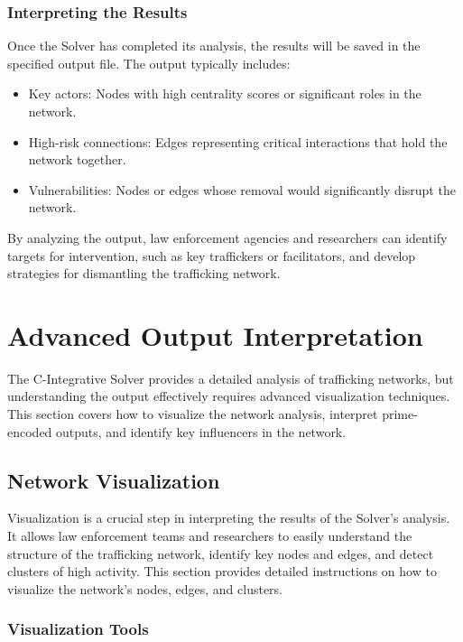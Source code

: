 \documentclass[%
 preprint, linenumbers,
 amsmath,amssymb,
 aps, physrev,
]{revtex4-2}
\begin{document}
\subsubsection{Interpreting the Results}

Once the Solver has completed its analysis, the results will be saved in the specified output file. The output typically includes:
\begin{itemize}
    \item Key actors: Nodes with high centrality scores or significant roles in the network.
    \item High-risk connections: Edges representing critical interactions that hold the network together.
    \item Vulnerabilities: Nodes or edges whose removal would significantly disrupt the network.
\end{itemize}

By analyzing the output, law enforcement agencies and researchers can identify targets for intervention, such as key traffickers or facilitators, and develop strategies for dismantling the trafficking network.

\section{Advanced Output Interpretation}

The C-Integrative Solver provides a detailed analysis of trafficking networks, but understanding the output effectively requires advanced visualization techniques. This section covers how to visualize the network analysis, interpret prime-encoded outputs, and identify key influencers in the network.

\subsection{Network Visualization}

Visualization is a crucial step in interpreting the results of the Solver’s analysis. It allows law enforcement teams and researchers to easily understand the structure of the trafficking network, identify key nodes and edges, and detect clusters of high activity. This section provides detailed instructions on how to visualize the network’s nodes, edges, and clusters.

\subsubsection{Visualization Tools}
\end{document}
